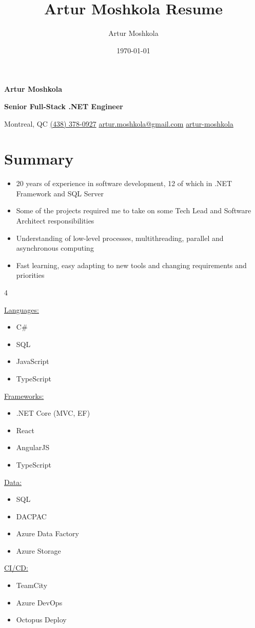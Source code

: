 \documentclass[letterpaper,10pt]{article}
\title{Artur Moshkola Resume}
\author{Artur Moshkola}
\date{\today}
\newcommand{\name}[1]{
  \LARGE
  \fontfamily{phv}\selectfont
  \begin{center} \textbf{#1} \end{center}\par
  \normalsize\normalfont
}
\newcommand{\position}[1]{
  \Large
  \fontfamily{phv}\selectfont
  \begin{center} \textbf{#1} \end{center}\par
  \normalsize\normalfont
}
\newcommand\contact[4]{
    \faCity \space #1 \hfill \faPhone \space \href{tel:#2}{#2} \hfill \faAt \space \href{mailto:#3}{#3} \hfill \faLinkedin \space \href{https://www.linkedin.com/in/#4/}{#4}
}
\newcommand\skillgroup[1]{
    \large\ttfamily\bfseries\raggedright\underline{#1:}\normalsize\normalfont
}
\begin{document}
\name{Artur Moshkola}
\position{Senior Full-Stack .NET Engineer}
\contact{Montreal, QC}{(438) 378-0927}{artur.moshkola@gmail.com}{artur-moshkola}

\section{Summary}
\begin{itemize}
    \item 20 years of experience in software development, 12 of which in .NET Framework and SQL Server
    \item Some of the projects required me to take on some Tech Lead and Software Architect responsibilities
    \item Understanding of low-level processes, multithreading, parallel and asynchronous computing
    \item Fast learning, easy adapting to new tools and changing requirements and priorities
\end{itemize}

\begin{multicols}{4}

\begin{minipage}{\linewidth}
\skillgroup{Languages}
\begin{itemize}
    \item C\#
    \item SQL
    \item JavaScript
    \item TypeScript
\end{itemize}
\end{minipage}

\begin{minipage}{\linewidth}
\skillgroup{Frameworks}
\begin{itemize}
    \item .NET Core (MVC, EF)
    \item React
    \item AngularJS
    \item TypeScript
\end{itemize}
\end{minipage}

\begin{minipage}{\linewidth}
\skillgroup{Data}
\begin{itemize}
    \item SQL
    \item DACPAC
    \item Azure Data Factory
    \item Azure Storage
\end{itemize}
\end{minipage}

\begin{minipage}{\linewidth}
\skillgroup{CI/CD}
\begin{itemize}
    \item TeamCity
    \item Azure DevOps
    \item Octopus Deploy
\end{itemize}
\end{minipage}

\end{multicols}
\end{document}
